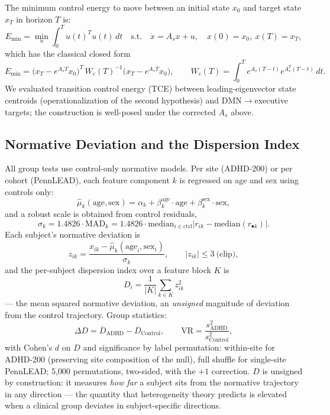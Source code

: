 \documentclass{article}
\begin{document}
The minimum control energy to move between an initial state $x_0$ and target state $x_T$ in horizon $T$ is:
\begin{equation}
E_{\min}=\min_{u}\int_0^{T} u(t)^{T}u(t)\,dt
\quad\text{s.t.}\quad
\dot{x}=A_s x+u,\quad x(0)=x_0,\ x(T)=x_T,
\end{equation}
which has the classical closed form
\begin{equation}
E_{\min}=\big(x_T-e^{A_sT}x_0\big)^{T}\,W_c(T)^{-1}\big(x_T-e^{A_sT}x_0\big),\qquad
W_c(T)=\int_0^{T} e^{A_s(T-t)}e^{A_s^{T}(T-t)}\,dt .
\end{equation}
We evaluated transition control energy (TCE) between leading-eigenvector state centroids (operationalization of the second hypothesis) and DMN$\to$executive targets; the construction is well-posed under the corrected $A_s$ above.

\subsection{Normative Deviation and the Dispersion Index}

All group tests use control-only normative models. Per site (ADHD-200) or per cohort (PennLEAD), each feature component $k$ is regressed on age and sex using controls only:
\begin{equation}
\hat{\mu}_k(\text{age},\text{sex})=\alpha_k+\beta_{k}^{\text{age}}\cdot\text{age}
+\beta_{k}^{\text{sex}}\cdot\text{sex},
\end{equation}
and a robust scale is obtained from control residuals,
\begin{equation}
\sigma_k = 1.4826\cdot\mathrm{MAD}_k
=1.4826\cdot\mathrm{median}_{i\in\text{ctrl}}\big|r_{ik}-\mathrm{median}(r_{\bullet k})\big|.
\end{equation}
Each subject's normative deviation is
\begin{equation}
z_{ik}=\frac{x_{ik}-\hat{\mu}_k(\text{age}_i,\text{sex}_i)}{\sigma_k},
\qquad |z_{ik}|\le 3\ \text{(clip)},
\end{equation}
and the per-subject dispersion index over a feature block $K$ is
\begin{equation}
\boxed{\ D_i=\frac{1}{|K|}\sum_{k\in K} z_{ik}^2\ }
\end{equation}
--- the mean squared normative deviation, an \emph{unsigned} magnitude of deviation from the control trajectory. Group statistics:
\begin{equation}
\Delta D=\overline{D}_{\mathrm{ADHD}}-\overline{D}_{\mathrm{Control}},\qquad
\mathrm{VR}=\frac{s^2_{\mathrm{ADHD}}}{s^2_{\mathrm{Control}}},
\end{equation}
with Cohen's $d$ on $D$ and significance by label permutation: within-site for ADHD-200 (preserving site composition of the null), full shuffle for single-site PennLEAD; 5{,}000 permutations, two-sided, with the $+1$ correction. $D$ is unsigned by construction: it measures \emph{how far} a subject sits from the normative trajectory in any direction --- the quantity that heterogeneity theory predicts is elevated when a clinical group deviates in subject-specific directions.
\end{document}
